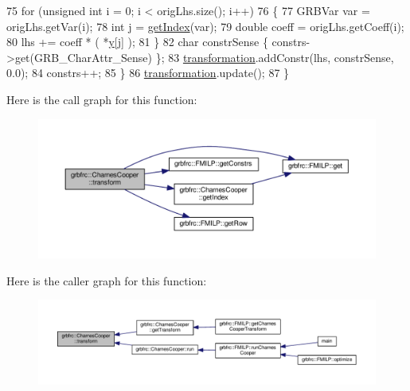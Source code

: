 \begin{DoxyCode}
75     \textcolor{keywordflow}{for} (\textcolor{keywordtype}{unsigned} \textcolor{keywordtype}{int} i = 0; i < origLhs.size(); i++)
76      \{
77       GRBVar var = origLhs.getVar(i);
78       \textcolor{keywordtype}{int} j = \hyperlink{classgrbfrc_1_1CharnesCooper_a48c5969100c05b92d2f60e8f48925b0d}{getIndex}(var);
79       \textcolor{keywordtype}{double} coeff = origLhs.getCoeff(i);
80       lhs += coeff * ( *\hyperlink{classgrbfrc_1_1CharnesCooper_a19e3874ce0b6242d4b7f8491bfae472f}{y}[j] );
81      \}
82     \textcolor{keywordtype}{char} constrSense \{ constrs->get(GRB\_CharAttr\_Sense) \};
83     \hyperlink{classgrbfrc_1_1CharnesCooper_a9107f891576f27501e5f103dca964359}{transformation}.addConstr(lhs, constrSense, 0.0);
84     constrs++;
85    \}
86   \hyperlink{classgrbfrc_1_1CharnesCooper_a9107f891576f27501e5f103dca964359}{transformation}.update();
87  \}
\end{DoxyCode}


Here is the call graph for this function\+:
\nopagebreak
\begin{figure}[H]
\begin{center}
\leavevmode
\includegraphics[width=350pt]{classgrbfrc_1_1CharnesCooper_a39fc997916d1ea49eb71befd41b00122_cgraph}
\end{center}
\end{figure}




Here is the caller graph for this function\+:
\nopagebreak
\begin{figure}[H]
\begin{center}
\leavevmode
\includegraphics[width=350pt]{classgrbfrc_1_1CharnesCooper_a39fc997916d1ea49eb71befd41b00122_icgraph}
\end{center}
\end{figure}


